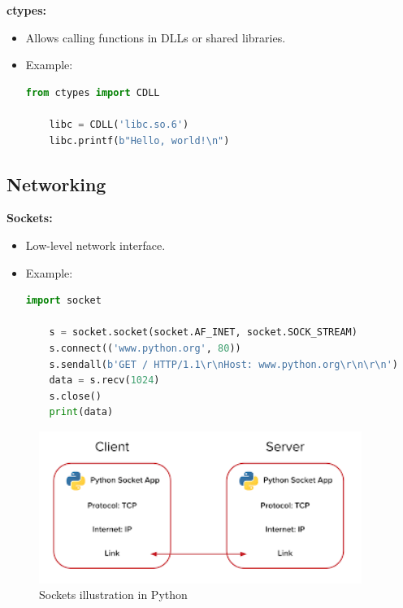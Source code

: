 \documentclass[12pt]{article}
\begin{document}
\textbf{ctypes:}
\begin{itemize}
    \item Allows calling functions in DLLs or shared libraries.

    \item Example:\\
    \begin{lstlisting}[language = Python]
    from ctypes import CDLL

    libc = CDLL('libc.so.6')
    libc.printf(b"Hello, world!\n")
    \end{lstlisting}
    
\end{itemize}

\subsection{Networking}

\textbf{Sockets:}
\begin{itemize}
    \item Low-level network interface.

    \item Example:\\
    \begin{lstlisting}[language = Python]
    import socket

    s = socket.socket(socket.AF_INET, socket.SOCK_STREAM)
    s.connect(('www.python.org', 80))
    s.sendall(b'GET / HTTP/1.1\r\nHost: www.python.org\r\n\r\n')
    data = s.recv(1024)
    s.close()
    print(data)
    \end{lstlisting}
    
\end{itemize}

\begin{figure}[h!]
\begin{center}
\includegraphics[width=10.5cm]{advanced8.png}\\
Sockets illustration in Python
\end{center}
\end{figure}
\end{document}
